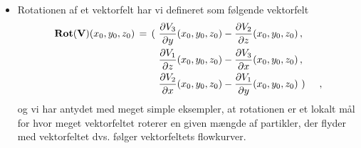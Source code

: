 \begin{summary}
\begin{itemize}
\item Rotationen af et vektorfelt har vi defineret som følgende vektorfelt
\begin{equation}
\begin{aligned}
\operatorname{\mathbf{Rot}}({\mathbf{V}})(x_{0},y_{0},z_{0}) \, = \, \Large{(} \, \,  &\frac{\partial
V_{3}}{\partial y}(x_{0},y_{0},z_{0}) - \frac{\partial
V_{2}}{\partial z}(x_{0},y_{0},z_{0})\, , \\
&\frac{\partial V_{1}}{\partial z}(x_{0},y_{0},z_{0}) -
\frac{\partial
V_{3}}{\partial x}(x_{0},y_{0},z_{0})\, , \\
&\frac{\partial V_{2}}{\partial x}(x_{0},y_{0},z_{0}) -
\frac{\partial V_{1}}{\partial y}(x_{0},y_{0},z_{0})\,\,  \Large{)} \quad ,
\end{aligned}
\end{equation}
og vi har antydet med meget simple eksempler, at rotationen er et lokalt  mål for hvor meget vektorfeltet roterer en given mængde af partikler, der flyder med vektorfeltet dvs. følger vektorfeltets flowkurver.
\end{itemize}
\end{summary}






